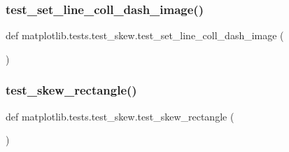 \subsubsection{\texorpdfstring{test\+\_\+set\+\_\+line\+\_\+coll\+\_\+dash\+\_\+image()}{test\_set\_line\_coll\_dash\_image()}}
{\footnotesize\ttfamily def matplotlib.\+tests.\+test\+\_\+skew.\+test\+\_\+set\+\_\+line\+\_\+coll\+\_\+dash\+\_\+image (\begin{DoxyParamCaption}{ }\end{DoxyParamCaption})}

\mbox{\label{namespacematplotlib_1_1tests_1_1test__skew_a1079648a509757a5161703405d225dd2}} 
\subsubsection{\texorpdfstring{test\+\_\+skew\+\_\+rectangle()}{test\_skew\_rectangle()}}
{\footnotesize\ttfamily def matplotlib.\+tests.\+test\+\_\+skew.\+test\+\_\+skew\+\_\+rectangle (\begin{DoxyParamCaption}{ }\end{DoxyParamCaption})}


